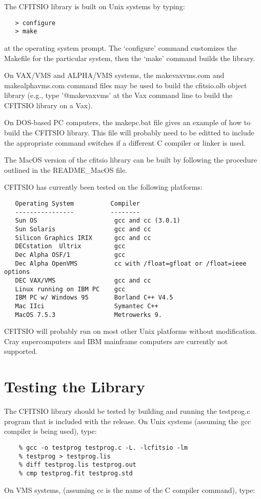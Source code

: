 The CFITSIO library is built on Unix systems by typing:

\begin{verbatim}
   > configure
   > make
\end{verbatim}
at the operating system prompt.  The `configure' command customizes the
Makefile for the particular system, then the `make' command builds the
library.

On VAX/VMS and ALPHA/VMS systems, the makevaxvms.com and
makealphavms.com command files may be used to build the cfitsio.olb
object library (e.g., type '@makevaxvms' at the Vax command line to
build the CFITSIO library on a Vax).

On DOS-based PC computers, the makepc.bat file gives an example of how
to build the CFITSIO library.  This file will probably need to be
editted to include the appropriate command switches if a different C
compiler or linker is used.

The MacOS version of the cfitsio library can be built by following the
procedure outlined in the README\_MacOS file.

CFITSIO has currently been tested on the following platforms:

\begin{verbatim}
   Operating System          Compiler
   ----------------          --------
   Sun OS                     gcc and cc (3.0.1)
   Sun Solaris                gcc and cc
   Silicon Graphics IRIX      gcc and cc
   DECstation  Ultrix         gcc
   Dec Alpha OSF/1            gcc
   Dec Alpha OpenVMS          cc with /float=gfloat or /float=ieee options
   DEC VAX/VMS                gcc and cc
   Linux running on IBM PC    gcc
   IBM PC w/ Windows 95       Borland C++ V4.5
   Mac IIci                   Symantec C++
   MacOS 7.5.3                Metrowerks 9.
\end{verbatim}
CFITSIO will probably run on most other Unix platforms without
modification.  Cray supercomputers and IBM mainframe computers are
currently not supported.


\section{Testing the Library}

The CFITSIO library should be tested by building and running
the testprog.c program that is included with the release.
On Unix systems (assuming the gcc compiler is being used), type:

\begin{verbatim}
    % gcc -o testprog testprog.c -L. -lcfitsio -lm
    % testprog > testprog.lis
    % diff testprog.lis testprog.out
    % cmp testprog.fit testprog.std
\end{verbatim}
 On VMS systems,
(assuming cc is the name of the C compiler command), type:

